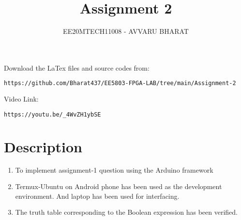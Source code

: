 \documentclass[journal,12pt,twocolumn]{IEEEtran}
\title{Assignment 2}
\author{EE20MTECH11008 - AVVARU BHARAT}
\numberwithin{equation}{section}
\begin{document}
\maketitle
Download the LaTex files and source codes from:
\begin{lstlisting}
https://github.com/Bharat437/EE5803-FPGA-LAB/tree/main/Assignment-2
\end{lstlisting}

Video Link:
\begin{lstlisting}
https://youtu.be/_4WvZH1ybSE
\end{lstlisting}






\maketitle

\section{Description}
\begin{enumerate}
    \item To implement assignment-1 question using the Arduino framework
    \item Termux-Ubuntu on Android phone has been used as the development environment. And laptop has been used for interfacing.
    
    \item The truth table corresponding to the Boolean expression has been verified.
\end{enumerate}
\end{document}
